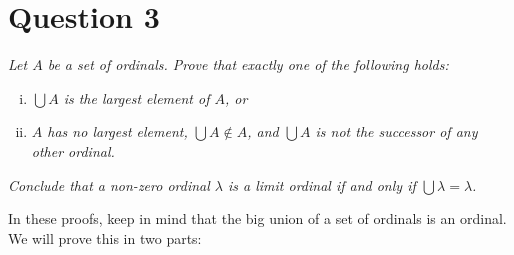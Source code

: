 \documentclass[a4paper]{article}
\begin{document}
\section*{Question 3}
\begin{flushleft}
  \textit{Let $A$ be a set of ordinals. Prove that exactly one of the following holds:}
  \begin{enumerate}[(i)]
    \item \textit{$\bigcup A$ is the largest element of $A$, or}
    \item \textit{$A$ has no largest element, $\bigcup A \notin A$, and 
      $\bigcup A$ is not the successor of any other ordinal.}
  \end{enumerate}
  \textit{Conclude that a non-zero ordinal $\lambda$ is a limit ordinal if and only if
  $\bigcup \lambda = \lambda$.}
\end{flushleft}
In these proofs, keep in mind
that the big union of a set of ordinals is an ordinal.
We will prove this in two parts:
\end{document}
